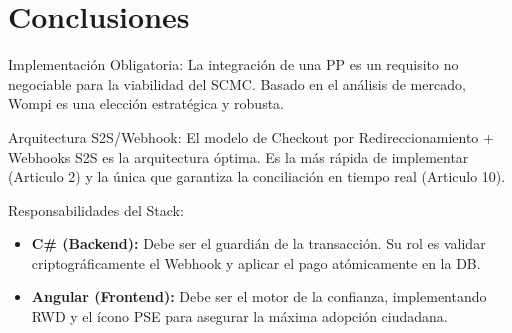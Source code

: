 \section{Conclusiones}
Implementación Obligatoria: La integración de una PP es un requisito no negociable para la viabilidad del SCMC. Basado en el análisis de mercado, Wompi es una elección estratégica y robusta.

Arquitectura S2S/Webhook: El modelo de Checkout por Redireccionamiento + Webhooks S2S es la arquitectura óptima. Es la más rápida de implementar (Articulo 2) y la única que garantiza la conciliación en tiempo real (Articulo 10).

Responsabilidades del Stack:
\begin{itemize}
    \item \textbf{C\# (Backend):} Debe ser el guardián de la transacción. Su rol es validar criptográficamente el Webhook y aplicar el pago atómicamente en la DB.
    \item \textbf{Angular (Frontend):} Debe ser el motor de la confianza, implementando RWD y el ícono PSE para asegurar la máxima adopción ciudadana.
\end{itemize}